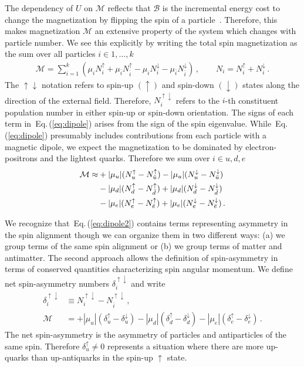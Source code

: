 \documentclass[epjST]{svjour}
\newcommand{\req}[1]{Eq.\,(\ref{#1})}
\begin{document}
The dependency of $U$ on $\mathcal{M}$ reflects that $\mathcal{B}$ is the incremental energy cost to change the magnetization by flipping the spin of a particle~\cite{Bali:2014kia}. Therefore, this makes magnetization $\mathcal{M}$ an extensive property of the system which changes with particle number. We see this explicitly by writing the total spin magnetization as the sum over all particles $i\in{1,\ldots,k}$
\begin{align}
\label{eq:dipole}
\mathcal{M} = \sum_{i=1}^{k}(\mu_{i}N_{i}^{\uparrow} + \mu_{\bar{i}}N_{\bar{i}}^{\uparrow} - \mu_{i}N_{i}^{\downarrow} - \mu_{\bar{i}}N_{\bar{i}}^{\downarrow})\,,\qquad
N_{i} = N_{i}^{\uparrow} + N_{i}^{\downarrow}\,.
\end{align}
The $\uparrow\downarrow$ notation refers to spin-up $(\uparrow)$ and spin-down $(\downarrow)$ states along the direction of the external field. Therefore, $N_{i}^{\uparrow\downarrow}$ refers to the $i$-th constituent population number in either spin-up or spin-down orientation. The signs of each term in~\req{eq:dipole} arises from the sign of the spin eigenvalue. While~\req{eq:dipole} presumably includes contributions from each particle with a magnetic dipole, we expect the magnetization to be dominated by electron-positrons and the lightest quarks. Therefore we sum over $i\in{u,d,e}$
\begin{align}
\notag\mathcal{M} \approx &+|\mu_{u}|(N_{u}^{\uparrow}-N_{\bar{u}}^{\uparrow})-|\mu_{u}|(N_{u}^{\downarrow}-N_{\bar{u}}^{\downarrow})\\
\notag &-|\mu_{d}|(N_{d}^{\uparrow}-N_{\bar{d}}^{\uparrow})+|\mu_{d}|(N_{d}^{\downarrow}-N_{\bar{d}}^{\downarrow})\\
\label{eq:dipole2}
&-|\mu_{e}|(N_{e}^{\uparrow}-N_{\bar{e}}^{\uparrow})+|\mu_{e}|(N_{e}^{\downarrow}-N_{\bar{e}}^{\downarrow})\,.
\end{align}

We recognize that~\req{eq:dipole2} contains terms representing asymmetry in the spin alignment though we can organize them in two different ways: (a) we group terms of the same spin alignment or (b) we group terms of matter and antimatter. The second approach allows the definition of spin-asymmetry in terms of conserved quantities characterizing spin angular momentum. We define net spin-asymmetry numbers $\delta_{i}^{\uparrow\downarrow}$ and write
\begin{align}
\delta_{i}^{\uparrow\downarrow} &\equiv N_{i}^{\uparrow\downarrow}-N_{\bar{i}}^{\uparrow\downarrow}\,,\\
\mathcal{M} &= 
+|\mu_{u}|(\delta_{u}^{\uparrow}-\delta_{u}^{\downarrow})
-|\mu_{d}|(\delta_{d}^{\uparrow}-\delta_{d}^{\downarrow})
-|\mu_{e}|(\delta_{e}^{\uparrow}-\delta_{e}^{\downarrow})\,.
\end{align}
The net spin-asymmetry is the asymmetry of particles and antiparticles of the same spin. Therefore $\delta_{u}^{\uparrow}\neq0$ represents a situation where there are more up-quarks than up-antiquarks in the spin-up $\uparrow$ state.
\end{document}
